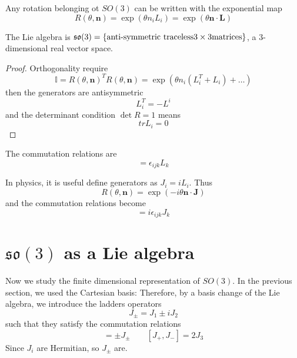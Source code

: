     Any rotation belonging ot $SO(3)$ can be written with the exponential map 
    \begin{equation*}
        R(\theta, \mathbf n) = \exp(\theta n_i L_i) = \exp(\theta \mathbf n \cdot \mathbf L)
    \end{equation*}

    The Lie algebra is $\mathfrak{so}(3) = \{\textnormal{anti-symmetric traceless} 3 \times 3 \textnormal{matrices}\}$, a $3$-dimensional real vector space.
    \begin{proof}
        Orthogonality require 
        \begin{equation*}
            \mathbb I = R(\theta, \mathbf n)^T R(\theta, \mathbf n) = \exp(\theta n_i (L_i^T + L_i) + \ldots)
        \end{equation*}
        then the generators are antisymmetric 
        \begin{equation*}
            L^T_i = - L^i
        \end{equation*}
        and the determinant condition $\det R = 1$ means 
        \begin{equation*}
            tr L_i = 0 
        \end{equation*}
    \end{proof}

    The commutation relations are 
    \begin{equation*}
        [L_i, L_j] = \epsilon_{ijk} L_k
    \end{equation*}

    In physics, it is useful define generators as $J_i = i L_i$. Thus 
    \begin{equation*}
        R(\theta, \mathbf n) = \exp(- i \theta \mathbf n \cdot \mathbf J)
    \end{equation*}
    and the commutation relations become
    \begin{equation*}
        [J_i, J_j] = i \epsilon_{ijk} J_k
    \end{equation*}
    
\section{$\mathfrak{so}(3)$ as a Lie algebra}

    Now we study the finite dimensional representation of $SO(3)$. In the previous section, we used the Cartesian basis: Therefore, by a basis change of the Lie algebra, we introduce the ladders operators  
    \begin{equation*}
        J_\pm = J_1 \pm i J_2
    \end{equation*}
    such that they satisfy the commutation relations 
    \begin{equation*}
        [J_3, J_\pm] = \pm J_\pm \qquad [J_+, J_-] = 2 J_3
    \end{equation*}
    Since $J_i$ are Hermitian, so $J_\pm$ are. 

